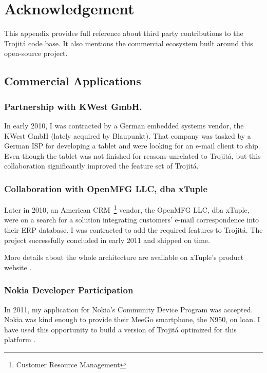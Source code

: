 \documentclass[trojita]{subfiles}
\begin{document}
\chapter{Acknowledgement}
\label{sec:acknowledgement}

This appendix provides full reference about third party contributions to the Trojitá code base.  It also mentions the
commercial ecosystem built around this open-source project.

\section{Commercial Applications}

\subsection{Partnership with KWest GmbH.}

In early 2010, I was contracted \cite{kwest-trojita} by a German embedded systems vendor, the KWest GmbH (lately
acquired by Blaupunkt).  That company was tasked by a German ISP for developing a tablet and were looking for an e-mail
client to ship.  Even though the tablet was not finished for reasons unrelated to Trojitá, but this collaboration
significantly improved the feature set of Trojitá.

\subsection{Collaboration with OpenMFG LLC, dba xTuple}

Later in 2010, an American CRM~\footnote{Customer Resource Management} vendor, the OpenMFG LLC, dba xTuple, were on a
search for a solution integrating customers' e-mail correspondence into their ERP database.  I was contracted to add the
required features to Trojitá.  The project successfully concluded in early 2011 and shipped on time.

More details about the whole architecture are available on xTuple's product website \cite{xtuple-trojita}.

\subsection{Nokia Developer Participation}

In 2011, my application for Nokia's Community Device Program was accepted.  Nokia was kind enough to provide their MeeGo
smartphone, the N950, on loan.  I have used this opportunity to build a version of Trojitá optimized for this platform
\cite{trojita-n950-preview}.
\end{document}
